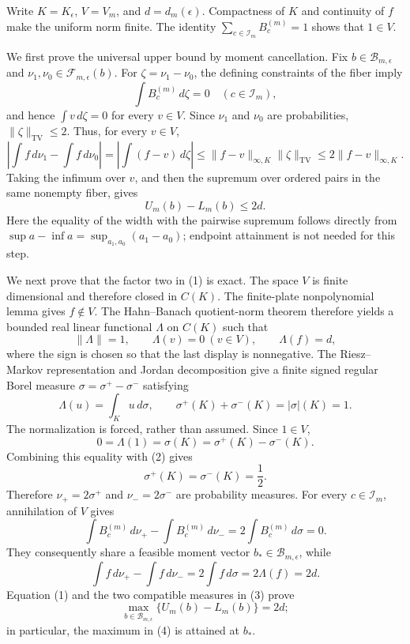 Write \(K=K_{\epsilon}\), \(V=V_m\), and \(d=d_m(\epsilon)\).  Compactness of \(K\) and continuity of \(f\) make the uniform norm finite.  The identity \(\sum_{c\in\mathcal I_m}B_c^{(m)}=1\) shows that \(1\in V\).

We first prove the universal upper bound by moment cancellation.  Fix \(b\in\mathcal B_{m,\epsilon}\) and \(\nu_1,\nu_0\in\mathcal F_{m,\epsilon}(b)\).  For \(\zeta=\nu_1-\nu_0\), the defining constraints of the fiber imply
\[
 \int B_c^{(m)}\,d\zeta=0\quad(c\in\mathcal I_m),
\]
and hence \(\int v\,d\zeta=0\) for every \(v\in V\).  Since \(\nu_1\) and \(\nu_0\) are probabilities, \(\|\zeta\|_{\mathrm{TV}}\leq2\).  Thus, for every \(v\in V\),
\[
 \left|\int f\,d\nu_1-\int f\,d\nu_0\right|
 =\left|\int(f-v)\,d\zeta\right|
 \leq\|f-v\|_{\infty,K}\|\zeta\|_{\mathrm{TV}}
 \leq2\|f-v\|_{\infty,K}.
\]
Taking the infimum over \(v\), and then the supremum over ordered pairs in the same nonempty fiber, gives
\[
 U_m(b)-L_m(b)\leq2d. \tag{1}
\]
Here the equality of the width with the pairwise supremum follows directly from \(\sup a-\inf a=\sup_{a_1,a_0}(a_1-a_0)\); endpoint attainment is not needed for this step.

We next prove that the factor two in (1) is exact.  The space \(V\) is finite dimensional and therefore closed in \(C(K)\).  The finite-plate nonpolynomial lemma gives \(f\notin V\).  The Hahn--Banach quotient-norm theorem therefore yields a bounded real linear functional \(\Lambda\) on \(C(K)\) such that
\[
 \|\Lambda\|=1,\qquad \Lambda(v)=0\ (v\in V),\qquad \Lambda(f)=d,
\]
where the sign is chosen so that the last display is nonnegative.  The Riesz--Markov representation and Jordan decomposition give a finite signed regular Borel measure \(\sigma=\sigma^+-\sigma^-\) satisfying
\[
 \Lambda(u)=\int_Ku\,d\sigma,\qquad
 \sigma^+(K)+\sigma^-(K)=|\sigma|(K)=1. \tag{2}
\]
The normalization is forced, rather than assumed.  Since \(1\in V\),
\[
 0=\Lambda(1)=\sigma(K)=\sigma^+(K)-\sigma^-(K).
\]
Combining this equality with (2) gives
\[
 \sigma^+(K)=\sigma^-(K)=\frac12.
\]
Therefore \(\nu_+=2\sigma^+\) and \(\nu_-=2\sigma^-\) are probability measures.  For every \(c\in\mathcal I_m\), annihilation of \(V\) gives
\[
 \int B_c^{(m)}\,d\nu_+-\int B_c^{(m)}\,d\nu_-
 =2\int B_c^{(m)}\,d\sigma=0.
\]
They consequently share a feasible moment vector \(b_*\in\mathcal B_{m,\epsilon}\), while
\[
 \int f\,d\nu_+-\int f\,d\nu_-
 =2\int f\,d\sigma=2\Lambda(f)=2d. \tag{3}
\]
Equation (1) and the two compatible measures in (3) prove
\[
 \max_{b\in\mathcal B_{m,\epsilon}}\{U_m(b)-L_m(b)\}=2d; \tag{4}
\]
in particular, the maximum in (4) is attained at \(b_*\).

